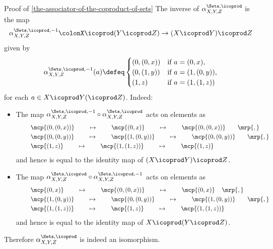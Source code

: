 \begin{Proof}{Proof of \cref{the-associator-of-the-coproduct-of-sets}}
    The inverse of $\alpha^{\Sets,\icoprod}_{X,Y,Z}$ is the map
    \[
        \alpha^{\Sets,\icoprod,-1}_{X,Y,Z}%
        \colon%
        X\icoprod(Y\icoprod Z)%
        \to%
        (X\icoprod Y)\icoprod Z%
    \]%
    given by
    \begin{align*}
        \alpha^{\Sets,\icoprod,-1}_{X,Y,Z}(a)%
        \defeq%
        \begin{cases}
            (0,(0,x)) &\text{if $a=(0,x)$,}\\
            (0,(1,y)) &\text{if $a=(1,(0,y))$,}\\
            (1,z)     &\text{if $a=(1,(1,z))$}
        \end{cases}
    \end{align*}
    for each $a\in X\icoprod Y(\icoprod Z)$. Indeed:
    \begin{itemize}
        \item{}The map $\alpha^{\Sets,\icoprod,-1}_{X,Y,Z}\circ\alpha^{\Sets,\icoprod}_{X,Y,Z}$ acts on elements as
            \begin{align*}
                &\mkern40mu\mcp{(0,(0,x))}\mkern40mu \mapsto \mkern40mu\mcp{(0,x)}    \mkern40mu \mapsto \mkern40mu\mcp{(0,(0,x))}\mkern35mu\mrp{,}\\
                &\mkern40mu\mcp{(0,(0,y))}\mkern40mu \mapsto \mkern40mu\mcp{(1,(0,y))}\mkern40mu \mapsto \mkern40mu\mcp{(0,(0,y))}\mkern35mu\mrp{,}\\
                &\mkern40mu\mcp{(1,z)}\mkern40mu     \mapsto \mkern40mu\mcp{(1,(1,z))}\mkern40mu \mapsto \mkern40mu\mcp{(1,z)}
            \end{align*}
            and hence is equal to the identity map of $(X\icoprod Y)\icoprod Z$.
        \item{}The map $\alpha^{\Sets,\icoprod}_{X,Y,Z}\circ\alpha^{\Sets,\icoprod,-1}_{X,Y,Z}$ acts on elements as
            \begin{align*}
                &\mkern40mu\mcp{(0,x)}\mkern40mu     \mapsto \mkern40mu\mcp{(0,(0,x))}\mkern40mu \mapsto \mkern40mu\mcp{(0,x)}\mkern20mu\mrp{,}\\
                &\mkern40mu\mcp{(1,(0,y))}\mkern40mu \mapsto \mkern40mu\mcp{(0,(0,y))}\mkern40mu \mapsto \mkern40mu\mcp{(1,(0,y))}\mkern35mu\mrp{,}\\
                &\mkern40mu\mcp{(1,(1,z))}\mkern40mu \mapsto \mkern40mu\mcp{(1,z)}\mkern40mu     \mapsto \mkern40mu\mcp{(1,(1,z))}\mkern40mu
            \end{align*}
            and hence is equal to the identity map of $X\icoprod(Y\icoprod Z)$.
    \end{itemize}
    Therefore $\alpha^{\Sets,\icoprod}_{X,Y,Z}$ is indeed an isomorphism.


\end{Proof}
